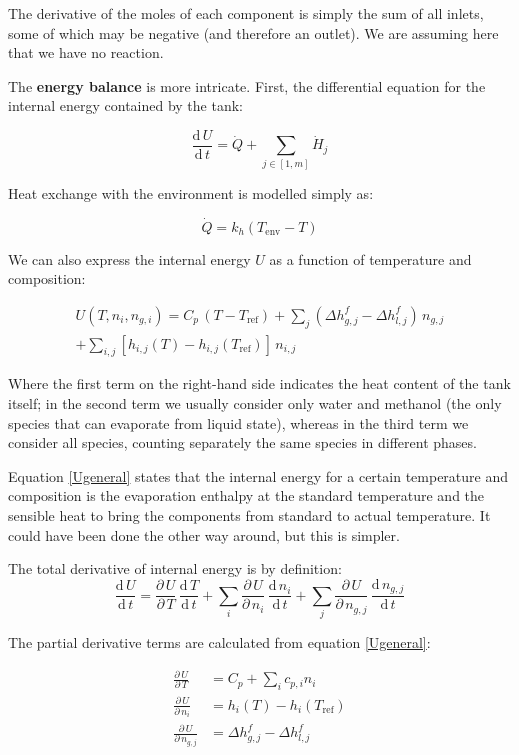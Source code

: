 \documentclass[a4paper]{article}
\renewcommand{\d}{\ensuremath{\mathrm{d}}}
\newcommand{\der}[2]{\ensuremath{\frac{\d \, #1}{\d \, #2}}}
\newcommand{\pder}[2]{\ensuremath{\frac{\partial \, #1}{\partial \, #2}}}
\begin{document}
The derivative of the moles of each component is simply the sum of all inlets,
some of which may be negative (and therefore an outlet). We are assuming here
that we have no reaction.

The \textbf{energy balance} is more intricate. First, the differential equation
for the internal energy contained by the tank:

\begin{equation}
\label{firstlaw}
\der{U}{t} = \dot Q + \sum_{j \in [1, m]} \dot H_j
\end{equation}

Heat exchange with the environment is modelled simply as:

\begin{equation}
\dot Q = k_h ( T_\text{env} - T )
\end{equation}

We can also express the internal energy $U$ as a function of temperature and
composition:

\begin{multline}
\label{Ugeneral}
U(T, n_i, n_{g,i}) = C_p \, ( T - T_\text{ref} ) +
\sum_j \left (\Delta h _{g,j}^f - \Delta h _{l,j}^f \right) \, n_{g,j} \\
+ \sum_{i,j} [ h_{i,j}(T) - h_{i,j}(T_\text{ref})] \, n_{i,j}
\end{multline}


Where the first term on the right-hand side indicates the heat content of the
tank itself; in the second term we usually consider only water
and methanol (the only species that can evaporate from liquid state), whereas
in the third term we consider all species, counting separately the same species
in different phases.

Equation \ref{Ugeneral} states that the internal energy for a certain
temperature and composition is the evaporation enthalpy at the standard
temperature and the sensible heat to bring the components from standard to
actual temperature. It could have been done the other way around, but this is
simpler.

The total derivative of internal energy is by definition:
\begin{equation}
\label{totalDerU}
\der{U}{t} = \pder{U}{T}\,\der{T}{t} + \sum_i \pder{U}{n_i}\,\der{n_i}{t} +
\sum_j \pder{U}{n_{g,j}}\,\der{n_{g,j}}{t}
\end{equation}

The partial derivative terms are calculated from equation \ref{Ugeneral}:

\begin{align}
\pder{U}{T} & = C_p + \sum_i c_{p,i} n_i\\
\pder{U}{n_i} & = h_i(T) - h_i(T_\text{ref})\\
\pder{U}{n_{g,j}} & = \Delta h _{g,j}^f - \Delta h _{l,j}^f
\end{align}
\end{document}
